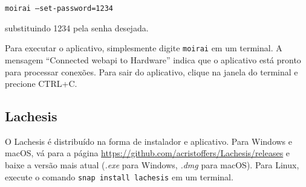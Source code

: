 \texttt{moirai --set-password=1234}

substituindo 1234 pela senha desejada.

Para executar o aplicativo, simplesmente digite \texttt{moirai} em um
terminal. A mensagem \enquote{Connected webapi to Hardware} indica que o
aplicativo está pronto para processar conexões. Para sair do aplicativo, clique
na janela do terminal e precione CTRL+C.

\subsection{Lachesis}%
\label{subsec:install-lachesis}

O Lachesis é distribuído na forma de instalador e aplicativo. Para Windows e
macOS, vá para a página \url{https://github.com/acristoffers/Lachesis/releases}
e baixe a versão mais atual (\textit{.exe} para Windows, \textit{.dmg} para
macOS). Para Linux, execute o comando \texttt{snap install lachesis}
em um terminal.
